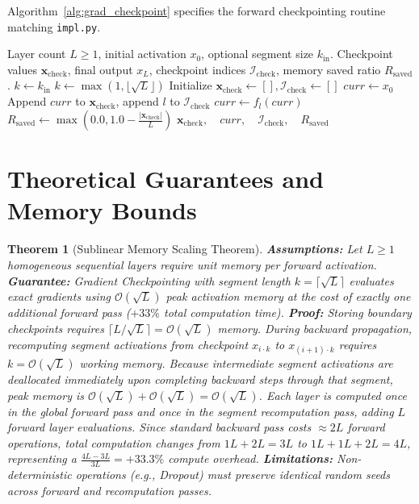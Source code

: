 \documentclass[11pt]{article}
\newtheorem{theorem}{Theorem}
\begin{document}
Algorithm~\ref{alg:grad_checkpoint} specifies the forward checkpointing routine matching \texttt{impl.py}.

\begin{algorithm}[H]
\caption{Gradient Checkpointing Forward Execution and Checkpoint Stash}
\label{alg:grad_checkpoint}
\begin{algorithmic}[1]
\Require Layer count $L \ge 1$, initial activation $x_0$, optional segment size $k_{\mathrm{in}}$.
\Ensure Checkpoint values $\mathbf{x}_{\mathrm{check}}$, final output $x_L$, checkpoint indices $\mathcal{I}_{\mathrm{check}}$, memory saved ratio $R_{\mathrm{saved}}$.
    \State $k \gets k_{\mathrm{in}}$
\Else
    \State $k \gets \max(1, \lfloor\sqrt{L}\rfloor)$
\EndIf
\State Initialize $\mathbf{x}_{\mathrm{check}} \gets [], \mathcal{I}_{\mathrm{check}} \gets []$
\State $curr \gets x_0$
        \State Append $curr$ to $\mathbf{x}_{\mathrm{check}}$, append $l$ to $\mathcal{I}_{\mathrm{check}}$
    \EndIf
    \State $curr \gets f_l(curr)$ 
\EndFor
\State $R_{\mathrm{saved}} \gets \max\left(0.0, 1.0 - \frac{|\mathbf{x}_{\mathrm{check}}|}{L}\right)$
\State \Return $\mathbf{x}_{\mathrm{check}}, \quad curr, \quad \mathcal{I}_{\mathrm{check}}, \quad R_{\mathrm{saved}}$
\end{algorithmic}
\end{algorithm}

\section{Theoretical Guarantees and Memory Bounds}
\label{sec:guarantees}

\begin{theorem}[Sublinear Memory Scaling Theorem]
\label{thm:sublinear_memory}
\textbf{Assumptions:} Let $L \ge 1$ homogeneous sequential layers require unit memory per forward activation.
\textbf{Guarantee:} Gradient Checkpointing with segment length $k = \lceil\sqrt{L}\rceil$ evaluates exact gradients using $\mathcal{O}(\sqrt{L})$ peak activation memory at the cost of exactly one additional forward pass ($+33\%$ total computation time).
\textbf{Proof:}
Storing boundary checkpoints requires $\lceil L / \sqrt{L} \rceil = \mathcal{O}(\sqrt{L})$ memory. During backward propagation, recomputing segment activations from checkpoint $x_{i \cdot k}$ to $x_{(i+1) \cdot k}$ requires $k = \mathcal{O}(\sqrt{L})$ working memory. Because intermediate segment activations are deallocated immediately upon completing backward steps through that segment, peak memory is $\mathcal{O}(\sqrt{L}) + \mathcal{O}(\sqrt{L}) = \mathcal{O}(\sqrt{L})$.
Each layer is computed once in the global forward pass and once in the segment recomputation pass, adding $L$ forward layer evaluations. Since standard backward pass costs $\approx 2L$ forward operations, total computation changes from $1L + 2L = 3L$ to $1L + 1L + 2L = 4L$, representing a $\frac{4L - 3L}{3L} = +33.3\%$ compute overhead.
\textbf{Limitations:} Non-deterministic operations (e.g., Dropout) must preserve identical random seeds across forward and recomputation passes.
\end{theorem}
\end{document}

